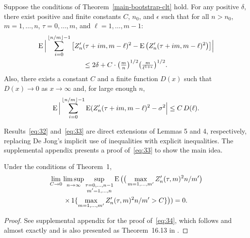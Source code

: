 \documentclass[11pt]{article}
\begin{document}
\begin{lem}\label{dejong-restatement-lemma}
\newcommand{\isum}{\sum_{i=0}^{\lfloor n/m \rfloor - 1}}
  Suppose the conditions of Theorem~\ref{main-bootstrap-clt} hold.
  For any positive $\delta$, there exist positive and finite constants
  $C$, $n_0$, and $\epsilon$ such that
  for all $n > n_0$, $m = 1,\dots,n$, $\tau = 0,\dots,m$, and $\ell =
  1,\dots,m-1$:
\begin{multline}\label{eq:32}
    \E \Big\lvert \isum \big[Z_n'(\tau + i m, m - \ell)^2
    - \E \big(Z_n'(\tau + i m, m - \ell)^2\big) \big]\Big\rvert \\
    \leq 2 \delta + C \cdot \big(\tfrac{m}{n}\big)^{1/2}
    \big(\tfrac{m}{\ell^{1+\epsilon}}\big)^{1/2}.
\end{multline}
Also, there exists a constant $C$ and a finite function $D(x)$ such
that $D(x) \to 0$ as $x \to \infty$ and, for large enough $n$,
  \begin{equation}
    \label{eq:33}
    \E \Big\lvert \isum \E(Z_n'(\tau + i m, m - \ell)^2
    - \sigma^2 \Big\rvert \leq C\, D(\ell).
  \end{equation}
\end{lem}

Results~\eqref{eq:32} and~\eqref{eq:33} are direct extensions of
 Lemmas 5 and 4, respectively, replacing De Jong's
implicit use of inequalities with explicit inequalities. The
supplemental appendix presents a proof of~\eqref{eq:33} to show the
main idea.

\begin{lem}\label{zsq-uniform-integrability-lemma}
\newcommand{\uiterm}{\max_{m \in 1,\dots,m'} \Big(
  \sum_{t \in I_n(\tau, m)} (X_{nt} - \mu_{nt})\Big)^2 \Big/
  \sum_{t\in I_n(\tau, m')} c_{nt}^2}
\newcommand{\uitermb}{(1/m') \max_{m \in 1,\dots,m'} \Big(
  \sum_{t \in I_n^*(\tau, m)} (X_{nt} - \mu_{nt})\Big)^2}
  Under the conditions of Theorem~1,
  \begin{multline}\label{eq:34}
    \lim_{C \to 0} \limsup_{n \to \infty} \sup_{\substack{\tau = 0,\dots,n-1 \\  m' = 1,\dots,n}}
    \operatorname{E}\big(\big(\max_{m=1,\dots,m'} Z'_n(\tau, m)^2 n / m'\big) \\
    \times\operatorname{1}\{\max_{m=1,\dots,m'} Z'_n(\tau, m)^2 n / m' > C\}\big)) = 0.
  \end{multline}
\end{lem}

\begin{proof}
  See supplemental appendix for the proof of~\eqref{eq:34}, which
  follows \citet[Lemma 6.5]{Mcl:75b} and \citet[Lemma 3.5]{Mcl:77}
  almost exactly and is also presented as Theorem~16.13 in
  \citet{Dav:94}.
\end{proof}


\end{document}

